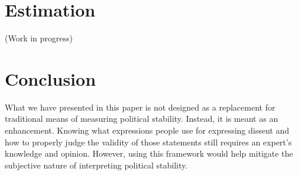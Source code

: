 \documentclass[12pt]{article}
\begin{document}
\begin{spacing}{1.5}








  
\section*{Estimation}   

(Work in progress)

\section*{Conclusion}

What we have presented in this paper is not designed as a replacement for traditional means of measuring political stability. Instead, it is meant as an enhancement. Knowing what expressions people use for expressing dissent and how to properly judge the validity of those statements still requires an expert's knowledge and opinion. However, using this framework would help mitigate the subjective nature of interpreting political stability. 





\end{spacing}

\pagebreak




\nocite{*}
\end{document}
